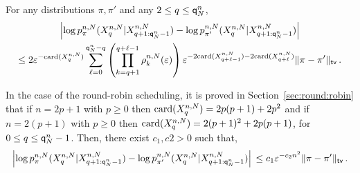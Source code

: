 \begin{lemma}
For any distributions $\pi,\pi'$ and any $2\le q\le {\mathsf{q}}^{n}_{N}$,
\begin{multline*}
\left|\log p_{\pi}^{n,N}(X_{q}^{n,N}|X_{q+1:{\mathsf{q}}^{n}_{N}-1}^{n,N}) - \log p_{\pi'}^{n,N}(X_{q}^{n,N}|X_{q+1:{\mathsf{q}}^{n}_{N}-1}^{n,N})\right| \\
\leq 2\varepsilon^{-\mathrm{card}(X^{n,N}_{q})}\sum_{\ell= 0}^{{\mathsf{q}}^{n}_{N}-q}\left(\prod_{k = q+1}^{q+\ell-1}\rho^{n,N}_k(\varepsilon)\right)\varepsilon^{-2\mathrm{card}(X^{n,N}_{q+\ell-1})-2\mathrm{card}(X^{n,N}_{q+\ell})}\|\pi-\pi'\|_{\mathsf{tv}}\,.
\end{multline*}
\end{lemma}
\begin{remark}
\label{rem:forgetting:tv}
In the case of the round-robin scheduling, it is proved in Section~\ref{sec:round:robin} that if  $n = 2p+1$ with $p\ge 0$ then $\mathrm{card}(X^{n,N}_{q}) = 2p(p+1) + 2p^2$ and  if  $n = 2(p+1)$ with $p\ge 0$ then $\mathrm{card}(X^{n,N}_{q}) = 2(p+1)^2 + 2p(p+1)$, for $0 \le q\le {\mathsf{q}}^{n}_{N}-1$. Then, there exist $c_1,c2 >0$ such that,
\[
\left|\log p_{\pi}^{n,N}(X_{q}^{n,N}|X_{q+1:{\mathsf{q}}^{n}_{N}-1}^{n,N}) - \log p_{\pi'}^{n,N}(X_{q}^{n,N}|X_{q+1:{\mathsf{q}}^{n}_{N}-1}^{n,N})\right| \\
\leq c_1\varepsilon^{-c_2n^2}\|\pi-\pi'\|_{\mathsf{tv}}\,.
\]
\end{remark}
